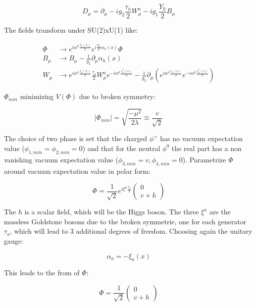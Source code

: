 \documentclass[12pt,oneside]{book}
\begin{document}
\begin{equation}
    D_\mu = \partial_\mu - ig_2 \frac{\tau_a}{2}W^a_\mu - ig_1\frac{Y_h}{2}B_\mu
\end{equation}

The fields transform under SU(2)xU(1) like:

\begin{align}
    \Phi &\to e^{i\alpha^a\frac{\tau_a(x)}{2}}e^{i\frac{Y_h}{2} \alpha_h(x)}\Phi \\
    B_\mu &\to B_\mu -\frac{1}{g_1}\partial_\mu\alpha_h(x) \nonumber \\ 
    W_\mu &\to e^{i\alpha^a\frac{\tau_a(x)}{2}} \frac{\tau_a}{2}W^{a}_{\mu} e^{-i\alpha^a\frac{\tau^\dagger_a(x)}{2}} - \frac{1}{g_2}\partial_\mu (e^{i\alpha^a\frac{\tau_a(x)}{2}} e^{-i\alpha^a\frac{\tau^\dagger_a(x)}{2}})
\end{align}

$\Phi_{min}$ minimizing $V(\Phi)$ due to broken symmetry:

\begin{equation}
   |\Phi_{min}| = \sqrt{\frac{-\mu^2}{2\lambda}} \equiv \frac{v}{\sqrt{2}}
\end{equation}

The choice of two phase is set that the charged $\phi^{+}$ has no vacuum expectation value ($\phi_{1,min} = \phi_{2,min} = 0$) and that for the neutral $\phi^{0}$ the real part has a non vanishing vacuum expectation value ($\phi_{3, min} = v, \phi_{4, min} = 0$). Parametrize $\Phi$ around vacuum expectation value in polar form:

\begin{equation}
    \Phi = \frac{1}{\sqrt{2}}e^{i\xi^a\frac{\tau_a}{2}} \begin{pmatrix} 0 \\ v + h \end{pmatrix}
\end{equation}

The $h$ is a scalar field, which will be the Higgs boson. The three $\xi^a$ are the massless Goldstone bosons due to the broken symmetrie, one for each generator $\tau_a$, which will lead to 3 additional degrees of freedom. Choosing again the unitary gauge:

\begin{equation}
    \alpha_a = -\xi_a(x)
\end{equation} 

This leads to the from of $\Phi$:

\begin{equation}
    \Phi = \frac{1}{\sqrt{2}}\begin{pmatrix} 0 \\ v + h \end{pmatrix}
\end{equation}
\end{document}
